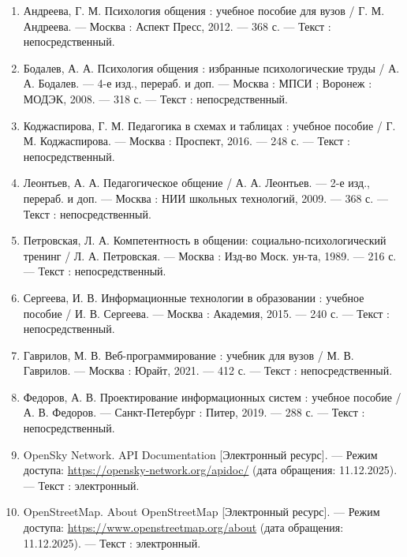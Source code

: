 \documentclass[14pt,a4paper,oneside]{extreport}
\begin{document}
\begin{enumerate}

  \item Андреева, Г. М. Психология общения : учебное пособие для вузов / Г. М. Андреева. — Москва : Аспект Пресс, 2012. — 368 с. — Текст : непосредственный.

  \item Бодалев, А. А. Психология общения : избранные психологические труды / А. А. Бодалев. — 4-е изд., перераб. и доп. — Москва : МПСИ ; Воронеж : МОДЭК, 2008. — 318 с. — Текст : непосредственный.

  \item Коджаспирова, Г. М. Педагогика в схемах и таблицах : учебное пособие / Г. М. Коджаспирова. — Москва : Проспект, 2016. — 248 с. — Текст : непосредственный.

  \item Леонтьев, А. А. Педагогическое общение / А. А. Леонтьев. — 2-е изд., перераб. и доп. — Москва : НИИ школьных технологий, 2009. — 368 с. — Текст : непосредственный.

  \item Петровская, Л. А. Компетентность в общении: социально-психологический тренинг / Л. А. Петровская. — Москва : Изд-во Моск. ун-та, 1989. — 216 с. — Текст : непосредственный.

  \item Сергеева, И. В. Информационные технологии в образовании : учебное пособие / И. В. Сергеева. — Москва : Академия, 2015. — 240 с. — Текст : непосредственный.

  \item Гаврилов, М. В. Веб-программирование : учебник для вузов / М. В. Гаврилов. — Москва : Юрайт, 2021. — 412 с. — Текст : непосредственный.

  \item Федоров, А. В. Проектирование информационных систем : учебное пособие / А. В. Федоров. — Санкт-Петербург : Питер, 2019. — 288 с. — Текст : непосредственный.

  \item OpenSky Network. API Documentation [Электронный ресурс]. — Режим доступа: \url{https://opensky-network.org/apidoc/} (дата обращения: 11.12.2025). — Текст : электронный.

  \item OpenStreetMap. About OpenStreetMap [Электронный ресурс]. — Режим доступа: \url{https://www.openstreetmap.org/about} (дата обращения: 11.12.2025). — Текст : электронный.


\end{enumerate}
\end{document}
